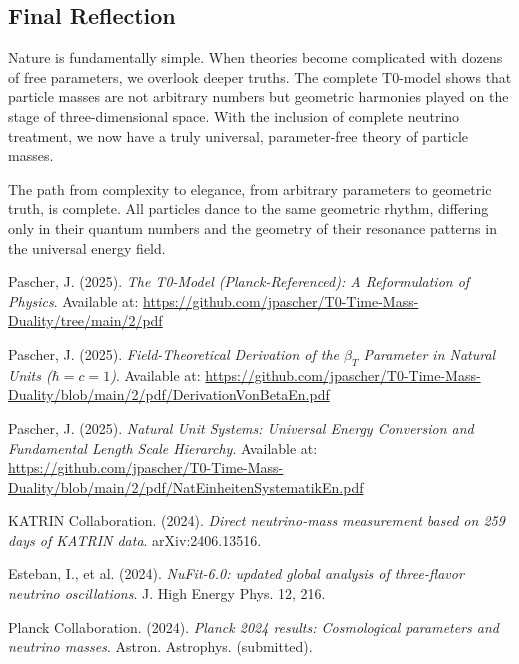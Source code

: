\documentclass[12pt,a4paper]{article}
\begin{document}
	\subsection{Final Reflection}
	\label{subsec:final_reflection}
	
	Nature is fundamentally simple. When theories become complicated with dozens of free parameters, we overlook deeper truths. The complete T0-model shows that particle masses are not arbitrary numbers but geometric harmonies played on the stage of three-dimensional space. With the inclusion of complete neutrino treatment, we now have a truly universal, parameter-free theory of particle masses.
	
	The path from complexity to elegance, from arbitrary parameters to geometric truth, is complete. All particles dance to the same geometric rhythm, differing only in their quantum numbers and the geometry of their resonance patterns in the universal energy field.
	
	\newpage
	\begin{thebibliography}{99}
		Pascher, J. (2025). \textit{The T0-Model (Planck-Referenced): A Reformulation of Physics}. Available at: \url{https://github.com/jpascher/T0-Time-Mass-Duality/tree/main/2/pdf}
		
		Pascher, J. (2025). \textit{Field-Theoretical Derivation of the $\beta_T$ Parameter in Natural Units ($\hbar = c = 1$)}. Available at: \url{https://github.com/jpascher/T0-Time-Mass-Duality/blob/main/2/pdf/DerivationVonBetaEn.pdf}
		
		Pascher, J. (2025). \textit{Natural Unit Systems: Universal Energy Conversion and Fundamental Length Scale Hierarchy}. Available at: \url{https://github.com/jpascher/T0-Time-Mass-Duality/blob/main/2/pdf/NatEinheitenSystematikEn.pdf}
		
		KATRIN Collaboration. (2024). \textit{Direct neutrino-mass measurement based on 259 days of KATRIN data}. arXiv:2406.13516.
		
		Esteban, I., et al. (2024). \textit{NuFit-6.0: updated global analysis of three-flavor neutrino oscillations}. J. High Energy Phys. 12, 216.
		
		Planck Collaboration. (2024). \textit{Planck 2024 results: Cosmological parameters and neutrino masses}. Astron. Astrophys. (submitted).
		
	\end{thebibliography}
	
\end{document}
